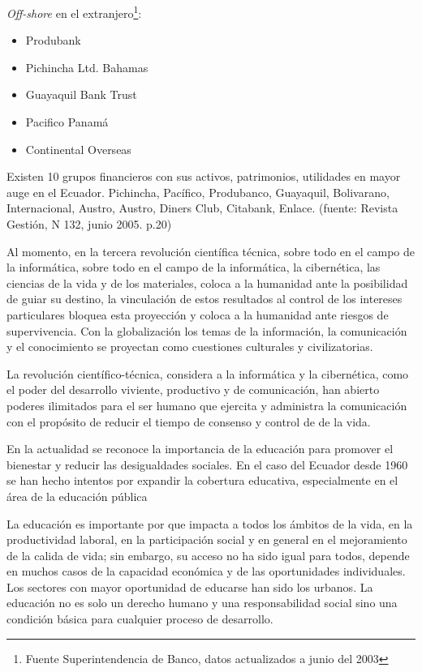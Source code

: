 \textit{Off-shore} en el extranjero\footnote{Fuente Superintendencia de Banco, datos actualizados a junio del 2003}:

\begin{itemize}
\item Produbank
\item Pichincha Ltd. Bahamas 
\item Guayaquil Bank Trust
\item Pacifico Panamá
\item Continental Overseas
\end{itemize}


Existen 10 grupos financieros con sus activos, patrimonios, utilidades en mayor auge en el Ecuador.  Pichincha, Pacífico, Produbanco, Guayaquil, Bolivarano, Internacional, Austro, Austro, Diners Club, Citabank, Enlace. (fuente: Revista Gestión, N 132, junio 2005. p.20)

Al momento, en la tercera revolución científica técnica, sobre todo en el campo de la informática, sobre todo en el campo de la informática, la cibernética, las ciencias de la vida y de los materiales, coloca a la humanidad ante la posibilidad de guiar su destino, la vinculación de estos resultados al control de los intereses particulares bloquea esta proyección y coloca a la humanidad ante riesgos de supervivencia. Con la  globalización los temas de la información, la comunicación y el conocimiento se proyectan como cuestiones culturales y civilizatorias.

La revolución  científico-técnica, considera a la informática y la cibernética, como el poder del desarrollo viviente, productivo y de comunicación,  han abierto poderes ilimitados  para el ser humano  que ejercita   y administra  la comunicación con el propósito de  reducir el tiempo de consenso y control de  de la vida. 

En la actualidad se reconoce  la importancia de la educación para promover el bienestar y reducir las desigualdades  sociales. En el caso del Ecuador desde 1960 se han hecho intentos por expandir la cobertura educativa, especialmente en el área  de la educación pública 

La educación es importante por que  impacta a todos los ámbitos de la vida, en la productividad laboral, en la participación social y en general en el mejoramiento de la calida de vida; sin embargo, su acceso no ha sido igual para todos, depende en muchos casos de la capacidad económica  y de las oportunidades individuales. Los sectores con mayor oportunidad de  educarse  han sido  los  urbanos. La educación no es solo un derecho humano y una responsabilidad social sino una condición básica para cualquier proceso de desarrollo.

